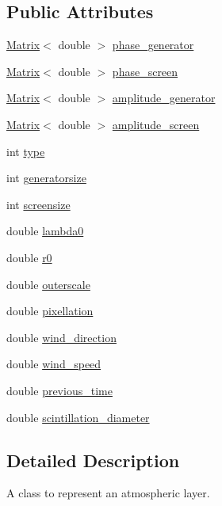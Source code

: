 \subsection*{Public Attributes}
\begin{DoxyCompactItemize}
\item 
\hyperlink{classMatrix}{Matrix}$<$ double $>$ \hyperlink{classAtmosphereLayer_ae1a5456c7be432f3fed0973dee92068f}{phase\_\-generator}
\item 
\hyperlink{classMatrix}{Matrix}$<$ double $>$ \hyperlink{classAtmosphereLayer_a00be2b274438470e9e60c10e48fdb4e3}{phase\_\-screen}
\item 
\hyperlink{classMatrix}{Matrix}$<$ double $>$ \hyperlink{classAtmosphereLayer_a9e216966fd99b419c0a92243500b7aeb}{amplitude\_\-generator}
\item 
\hyperlink{classMatrix}{Matrix}$<$ double $>$ \hyperlink{classAtmosphereLayer_a88963962454982df3760e2d4b0ff8463}{amplitude\_\-screen}
\item 
int \hyperlink{classAtmosphereLayer_a18a224d4bfa76d79230990279fdccb70}{type}
\item 
int \hyperlink{classAtmosphereLayer_af7a8b5a4fb4998b3ed4ad564faa78280}{generatorsize}
\item 
int \hyperlink{classAtmosphereLayer_adf9ae351a2a60df00cbbd3bd68d2fc02}{screensize}
\item 
double \hyperlink{classAtmosphereLayer_ad06e6f68425560b65b47713c5d871bc8}{lambda0}
\item 
double \hyperlink{classAtmosphereLayer_a21fe11753b8673dfec2f8909a230635d}{r0}
\item 
double \hyperlink{classAtmosphereLayer_ac9e60f4a28316e69c292e2e0af10e476}{outerscale}
\item 
double \hyperlink{classAtmosphereLayer_a46e0ed39d72c3caddb436d1259d490fb}{pixellation}
\item 
double \hyperlink{classAtmosphereLayer_a7347b89cf89fefc3d500f6b671b2fffb}{wind\_\-direction}
\item 
double \hyperlink{classAtmosphereLayer_ae3d2eb61e1c6273cd848ef8e8129410f}{wind\_\-speed}
\item 
double \hyperlink{classAtmosphereLayer_a9e62e416473b02e0084be732dbd3fdc0}{previous\_\-time}
\item 
double \hyperlink{classAtmosphereLayer_aa82dd3a608dae480bd90ade6262f6615}{scintillation\_\-diameter}
\end{DoxyCompactItemize}


\subsection{Detailed Description}
A class to represent an atmospheric layer. 

